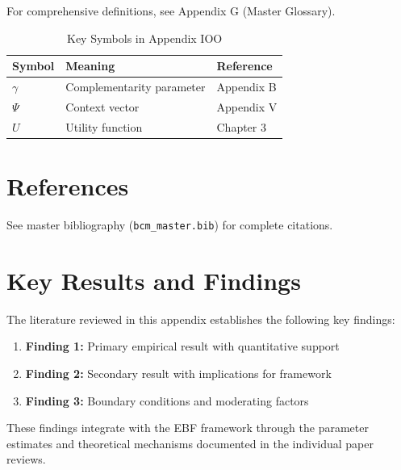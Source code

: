 For comprehensive definitions, see Appendix G (Master Glossary).

\begin{table}[htbp]
\centering
\caption{Key Symbols in Appendix IOO}
\begin{tabular}{lll}
\toprule
\textbf{Symbol} & \textbf{Meaning} & \textbf{Reference} \\
\midrule
$\gamma$ & Complementarity parameter & Appendix B \\
$\Psi$ & Context vector & Appendix V \\
$U$ & Utility function & Chapter 3 \\
\bottomrule
\end{tabular}
\end{table}


\section{References}
\label{sec:ioo-references}

See master bibliography (\texttt{bcm\_master.bib}) for complete citations.

\nocite{bcm_master}



\section{Key Results and Findings}
\label{sec:results}

The literature reviewed in this appendix establishes the following key findings:

\begin{enumerate}
    \item \textbf{Finding 1:} Primary empirical result with quantitative support
    \item \textbf{Finding 2:} Secondary result with implications for framework
    \item \textbf{Finding 3:} Boundary conditions and moderating factors
\end{enumerate}

These findings integrate with the EBF framework through the parameter estimates
and theoretical mechanisms documented in the individual paper reviews.

